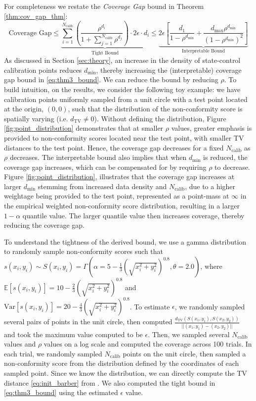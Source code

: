 \documentclass{l4dc2026}
\newcommand{\tvd}{d_\textrm{TV}}
\begin{document}
For completeness we restate the \textit{Coverage Gap} bound in Theorem \ref{thm:cov_gap_thm}: 
$$\text{Coverage Gap}\le \underbrace{\sum_{i=1}^{N_\textrm{calib}} \left( \frac{\rho^{d_i}}{1 + \sum_{j=1}^{N_\textrm{calib}} \rho^{d_j}} \right) \cdot 2\epsilon \cdot d_i}_{\text{Tight Bound}} \le \underbrace{2 \epsilon \left[  \frac{d_1 }{1 - \rho^{d_\text{min}}} + \frac{d_\text{max}\rho^{d_\text{min}}}{(1-\rho^{d_\text{min}})^2}\right]}_{\text{Interpretable Bound}}$$
As discussed in Section \ref{sec:theory}, an increase in the density of state-control calibration points reduces $d_\textrm{min}$, thereby increasing the (interpretable) coverage gap bound in \eqref{eq:thm3_bound}. We can reduce the bound by reducing $\rho$. To build intuition, on the results, we consider the following toy example: we have calibration points uniformly sampled from a unit circle with a test point located at the origin, $(0,0)$, such that the distribution of the non-conformity score is spatially varying (i.e. $\tvd \neq 0$). Without defining the distribution, Figure \ref{fig:point_distribution} demonstrates that at smaller $\rho$ values, greater emphasis is provided to non-conformity scores located near the test point, with smaller TV distances to the test point. Hence, the coverage gap decreases for a fixed $N_\textrm{calib}$ as $\rho$ decreases. The interpretable bound also implies that when $d_\textrm{min}$ is reduced, the coverage gap increases, which can be compensated for by requiring $\rho$ to decrease. Figure \ref{fig:point_distribution}, illustrates that the coverage gap increases at larger $d_\textrm{min}$ stemming from increased data density and $N_\textrm{calib}$, due to a higher weightage being provided to the test point, represented as a point-mass at $\infty$ in the empirical weighted non-conformity score distribution, resulting in a larger $1-\alpha$ quantile value. The larger quantile value then increases coverage, thereby reducing the coverage gap. 


To understand the tightness of the derived bound, we use a gamma distribution to randomly sample non-conformity scores such that $s(x_i,y_i) \sim S(x_i,y_i)= \Gamma(\alpha=5 - \frac{1}{3}(\sqrt{x_i^2+y_i^2})^{0.8}, \theta=2.0)$, where $\mathbb{E}[s(x_i,y_i)] = 10 - \frac{2}{3}(\sqrt{x_i^2+y_i^2})^{0.8}$ and $\textrm{Var}[s(x_i,y_i)]=20 - \frac{4}{3}(\sqrt{x_i^2+y_i^2})^{0.8}$. To estimate $\epsilon$, we randomly sampled several pairs of points in the unit circle, then computed $\frac{\tvd (S(x_1,y_1),S(x_2,y_2))}{||(x_1,y_1)-(x_2,y_2)||}$ and took the maximum value computed to be $\epsilon$. Then, we sampled several $N_\textrm{calib}$ values and $\rho$ values on a log scale and computed the coverage across 100 trials. In each trial, we randomly sampled $N_\textrm{calib}$ points on the unit circle, then sampled a non-conformity score from the distribution defined by the coordinates of each sampled point. Since we know the distribution, we can directly compute the TV distance \eqref{eq:init_barber} from \citet{barber2023conformal}. We also computed the tight bound in \eqref{eq:thm3_bound} using the estimated $\epsilon$ value. 
\end{document}
